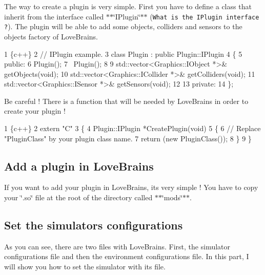 The way to create a plugin is very simple. First you have to define a class that inherit from the interface called $\ast$$\ast$\char`\"{}\+I\+Plugin\char`\"{}$\ast$$\ast$ ({\tt What is the I\+Plugin interface ?}). The plugin will be able to add some objects, colliders and sensors to the objects factory of Love\+Brains.


\begin{DoxyCode}
1 \{c++\}
2 // IPlugin example.
3 class Plugin : public Plugin::IPlugin
4 \{
5     public:
6         Plugin();
7         ~Plugin();
8 
9         std::vector<Graphics::IObject *>& getObjects(void);
10         std::vector<Graphics::ICollider *>& getColliders(void);
11         std::vector<Graphics::ISensor *>& getSensors(void);
12 
13     private:
14 \};
\end{DoxyCode}


Be careful ! There is a function that will be needed by Love\+Brains in order to create your plugin !


\begin{DoxyCode}
1 \{c++\}
2 extern "C"
3 \{
4   Plugin::IPlugin   *CreatePlugin(void)
5   \{
6     // Replace "PluginClass" by your plugin class name.
7     return (new PluginClass());
8   \}
9 \}
\end{DoxyCode}


\subsection*{Add a plugin in Love\+Brains}

If you want to add your plugin in Love\+Brains, it\textquotesingle{}s very simple ! You have to copy your \char`\"{}.\+so\char`\"{} file at the root of the directory called $\ast$$\ast$\char`\"{}mods\char`\"{}$\ast$$\ast$.

\subsection*{Set the simulator\textquotesingle{}s configurations}

As you can see, there are two files with Love\+Brains. First, the simulator configurations file and then the environment configurations file. In this part, I will show you how to set the simulator with its file.


